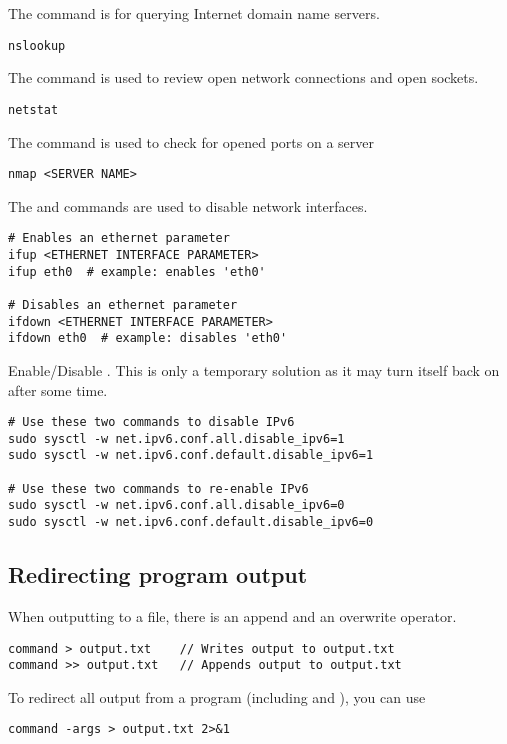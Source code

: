 The  command is for querying Internet domain name servers.
\begin{lstlisting}
nslookup
\end{lstlisting}

The  command is used to review open network connections and open sockets. 
\begin{lstlisting}
netstat
\end{lstlisting}

The  command is used to check for opened ports on a server
\begin{lstlisting}
nmap <SERVER NAME>
\end{lstlisting}

The  and  commands are used to disable network interfaces.
\begin{lstlisting}
# Enables an ethernet parameter
ifup <ETHERNET INTERFACE PARAMETER>
ifup eth0  # example: enables 'eth0'

# Disables an ethernet parameter
ifdown <ETHERNET INTERFACE PARAMETER>
ifdown eth0  # example: disables 'eth0'
\end{lstlisting}

Enable/Disable . This is only a temporary solution as it may turn itself back on after some time.
\begin{lstlisting}
# Use these two commands to disable IPv6
sudo sysctl -w net.ipv6.conf.all.disable_ipv6=1
sudo sysctl -w net.ipv6.conf.default.disable_ipv6=1

# Use these two commands to re-enable IPv6
sudo sysctl -w net.ipv6.conf.all.disable_ipv6=0
sudo sysctl -w net.ipv6.conf.default.disable_ipv6=0
\end{lstlisting}







\subsection{Redirecting program output}

When outputting to a file, there is an append and an overwrite operator.
\begin{lstlisting}
command > output.txt    // Writes output to output.txt
command >> output.txt   // Appends output to output.txt
\end{lstlisting}
To redirect all output from a program (including  and ), you can use 
\begin{lstlisting}
command -args > output.txt 2>&1
\end{lstlisting}






